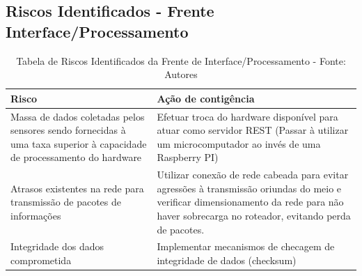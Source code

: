 \subsection*{Riscos Identificados - Frente Interface/Processamento}

\begin{table}[H]
    \begin{tabular}{|p{7cm}|p{7cm}|}
        \hline
        \textbf{Risco} & \textbf{Ação de contigência} \\ \hline
        Massa de dados coletadas pelos sensores sendo fornecidas à uma taxa superior à capacidade de processamento do hardware & Efetuar troca do hardware disponível para atuar como servidor REST (Passar à utilizar um microcomputador ao invés de uma Raspberry PI) \\ \hline
        Atrasos existentes na rede para transmissão de pacotes de informações & Utilizar conexão de rede cabeada para evitar agressões à transmissão oriundas do meio e verificar dimensionamento da rede para não haver sobrecarga no roteador, evitando perda de pacotes. \\ \hline
        Integridade dos dados comprometida & Implementar mecanismos de checagem de integridade de dados (checksum) \\ \hline
    \end{tabular}
    \caption{Tabela de Riscos Identificados da Frente de Interface/Processamento - Fonte: Autores}
    \label{tab:tabela_riscos_interface_processamento}
\end{table}

